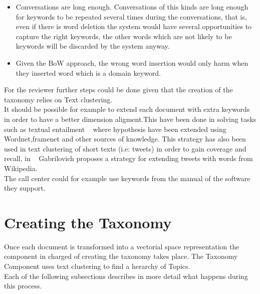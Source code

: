 \documentclass[4pt,a4paper]{article}
\begin{document}
\begin{itemize}
	\item Conversations are long enough. Conversations of this kinds are long enough for keywords to be repeated several times during the conversations, that is, even if there is word deletion the system would have several opportunities to capture the right keywords, the other words which are not likely to be keywords will be discarded by the system anyway.

  \item Given the BoW approach, the wrong word insertion would only harm when they inserted word which is a domain keyword.
  
\end{itemize}

For the reviewer further steps could be done given that the creation of the taxonomy relies on Text clustering.\\
It should be possible for example to extend each document with extra keywords in order to have a better dimension aligment.This have been done in solving tasks such as  textual entailment ~\cite{Mirkin:2009:EIU:1609067.1609129} where hypothesis have been extended using Wordnet,framenet and other sources of knowledge. This strategy has also been used in text clustering of short texts (i.e: tweets)  in order to gain coverage and recall, in ~\cite{Gabrilovich:2006:OBB:1597348.1597395} Gabrilovich proposes a strategy for extending tweets with words from Wikipedia.\\
The call center could for example use keywords from the manual of the software they support.


\section{Creating the Taxonomy}

Once each document is transformed into a vectorial space representation the component in charged of creating the taxonomy takes place. The Taxonomy Component uses text clustering to find a herarchy of Topics.\\
Each of the following subsections describes in more detail what happens during this process.
\end{document}

